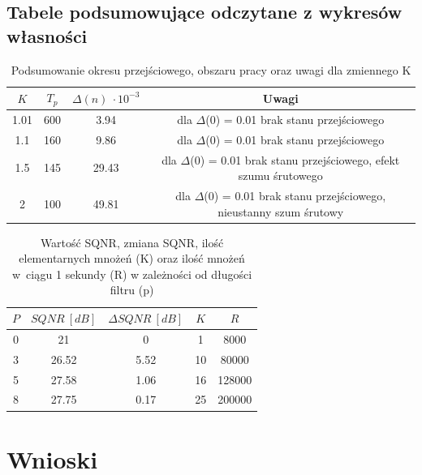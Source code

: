 \documentclass[12pt, a4paper, oneside]{article}
\begin{document}
\subsection{Tabele podsumowujące odczytane z wykresów własności}
\begin{table}[h]
  \centering
  \caption{Podsumowanie okresu przejściowego, obszaru pracy oraz uwagi dla zmiennego K}
    \begin{tabular}{|c|c|c|c|}\hline
    $K$ & $T_p$ & $\Delta(n)~\cdot 10^{-3}$ & Uwagi \\\hline
    1.01 & 600 & 3.94 & dla $\Delta$(0) = 0.01 brak stanu przejściowego \\\hline
    1.1 & 160 & 9.86 & dla $\Delta$(0) = 0.01 brak stanu przejściowego \\\hline
    1.5 & 145 & 29.43 & dla $\Delta$(0) = 0.01 brak stanu przejściowego, efekt szumu śrutowego \\\hline
    2 & 100 & 49.81 & dla $\Delta$(0) = 0.01 brak stanu przejściowego, nieustanny szum śrutowy \\\hline
    \end{tabular}%
  \label{tab:addlabel}%
\end{table}%
\begin{table}[h]
  \centering
  \caption{Wartość SQNR, zmiana SQNR, ilość elementarnych mnożeń (K) oraz ilość mnożeń w~ciągu 1 sekundy (R) w zależności od długości filtru (p)}
    \begin{tabular}{|c|c|c|c|c|}\hline
    $P$ & $SQNR~[dB]$ & $\Delta SQNR~[dB]$ & $K$ & $R$ \\\hline
    0 & 21 & 0 & 1 & 8000 \\\hline
    3 & 26.52 & 5.52 & 10 & 80000 \\\hline
    5 & 27.58 & 1.06 & 16 & 128000 \\\hline
    8 & 27.75 & 0.17 & 25 & 200000 \\\hline
    \end{tabular}%
  \label{tab:addlabel}%
\end{table}%
\clearpage
\section{Wnioski}
\end{document}
